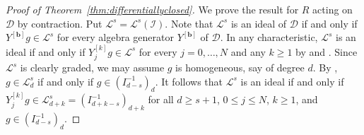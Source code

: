 \documentclass[12pt, reqno]{amsart}
\numberwithin{equation}{section}
\newcommand{\bb}{\mathbf{b}}
\newcommand{\cL}{{\mathcal L}}
\newcommand{\I}{{\mathcal I}}
\theoremstyle{plain} %
\theoremstyle{definition}
\theoremstyle{remark}
\begin{document}
\begin{proof}[Proof of Theorem~\ref{thm:differentiallyclosed}]
We prove the result for $R$ acting on $\mathcal{D}$ by contraction.  Put $\cL^s=\cL^s(\I)$.  Note that $\cL^s$ is an ideal of $\mathcal{D}$ if and only if $Y^{[\bb]}g\in \cL^s$ for every algebra generator $Y^{[\bb]}$ of $\mathcal{D}$.  In any characteristic, $\cL^s$ is an ideal if and only if $Y_j^{[k]}g\in \cL^s$ for every $j=0,\ldots,N$ and any $k\ge 1$ by  and .  Since $\cL^s$ is clearly graded, we may assume $g$ is homogeneous, say of degree $d$.  By , $g\in \cL^s_d$ if and only if $g\in \left(I^{-1}_{d-s}\right)_d$.  It follows that $\cL^s$ is an ideal if and only if $Y_j^{[k]}g\in \cL^s_{d+k}=\left(I^{-1}_{d+k-s}\right)_{d+k}$ for all $d\ge s+1$,  $0\le j\le N$, $k\ge 1$, and $g\in \left(I^{-1}_{d-s}\right)_d$.
	

\end{proof}
\end{document}
